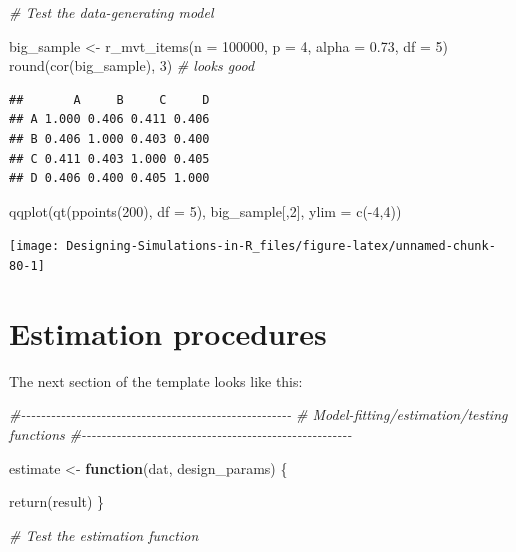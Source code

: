 \documentclass[
]{book}
\newenvironment{Shaded}{\begin{snugshade}}{\end{snugshade}}
\newcommand{\AttributeTok}[1]{\textcolor[rgb]{0.77,0.63,0.00}{#1}}
\newcommand{\CommentTok}[1]{\textcolor[rgb]{0.56,0.35,0.01}{\textit{#1}}}
\newcommand{\ControlFlowTok}[1]{\textcolor[rgb]{0.13,0.29,0.53}{\textbf{#1}}}
\newcommand{\DecValTok}[1]{\textcolor[rgb]{0.00,0.00,0.81}{#1}}
\newcommand{\FloatTok}[1]{\textcolor[rgb]{0.00,0.00,0.81}{#1}}
\newcommand{\FunctionTok}[1]{\textcolor[rgb]{0.00,0.00,0.00}{#1}}
\newcommand{\NormalTok}[1]{#1}
\newcommand{\OtherTok}[1]{\textcolor[rgb]{0.56,0.35,0.01}{#1}}
\newcommand{\SpecialCharTok}[1]{\textcolor[rgb]{0.00,0.00,0.00}{#1}}
\begin{document}
\begin{Shaded}
\begin{Highlighting}[]
\CommentTok{\# Test the data{-}generating model}

\NormalTok{big\_sample }\OtherTok{\textless{}{-}} \FunctionTok{r\_mvt\_items}\NormalTok{(}\AttributeTok{n =} \DecValTok{100000}\NormalTok{, }\AttributeTok{p =} \DecValTok{4}\NormalTok{, }\AttributeTok{alpha =} \FloatTok{0.73}\NormalTok{, }\AttributeTok{df =} \DecValTok{5}\NormalTok{)}
\FunctionTok{round}\NormalTok{(}\FunctionTok{cor}\NormalTok{(big\_sample), }\DecValTok{3}\NormalTok{) }\CommentTok{\# looks good}
\end{Highlighting}
\end{Shaded}

\begin{verbatim}
##       A     B     C     D
## A 1.000 0.406 0.411 0.406
## B 0.406 1.000 0.403 0.400
## C 0.411 0.403 1.000 0.405
## D 0.406 0.400 0.405 1.000
\end{verbatim}

\begin{Shaded}
\begin{Highlighting}[]
\FunctionTok{qqplot}\NormalTok{(}\FunctionTok{qt}\NormalTok{(}\FunctionTok{ppoints}\NormalTok{(}\DecValTok{200}\NormalTok{), }\AttributeTok{df =} \DecValTok{5}\NormalTok{), big\_sample[,}\DecValTok{2}\NormalTok{], }\AttributeTok{ylim =} \FunctionTok{c}\NormalTok{(}\SpecialCharTok{{-}}\DecValTok{4}\NormalTok{,}\DecValTok{4}\NormalTok{))}
\end{Highlighting}
\end{Shaded}

\begin{center}\texttt{[image: Designing-Simulations-in-R\_files/figure-latex/unnamed-chunk-80-1]} \end{center}

\hypertarget{estimation-procedures-1}{%
\section{Estimation procedures}\label{estimation-procedures-1}}

The next section of the template looks like this:

\begin{Shaded}
\begin{Highlighting}[]
\CommentTok{\#{-}{-}{-}{-}{-}{-}{-}{-}{-}{-}{-}{-}{-}{-}{-}{-}{-}{-}{-}{-}{-}{-}{-}{-}{-}{-}{-}{-}{-}{-}{-}{-}{-}{-}{-}{-}{-}{-}{-}{-}{-}{-}{-}{-}{-}{-}{-}{-}{-}{-}{-}{-}{-}{-}}
\CommentTok{\# Model{-}fitting/estimation/testing functions}
\CommentTok{\#{-}{-}{-}{-}{-}{-}{-}{-}{-}{-}{-}{-}{-}{-}{-}{-}{-}{-}{-}{-}{-}{-}{-}{-}{-}{-}{-}{-}{-}{-}{-}{-}{-}{-}{-}{-}{-}{-}{-}{-}{-}{-}{-}{-}{-}{-}{-}{-}{-}{-}{-}{-}{-}{-}}

\NormalTok{estimate }\OtherTok{\textless{}{-}} \ControlFlowTok{function}\NormalTok{(dat, design\_params) \{}

  \FunctionTok{return}\NormalTok{(result)}
\NormalTok{\}}

\CommentTok{\# Test the estimation function}
\end{Highlighting}
\end{Shaded}
\end{document}

